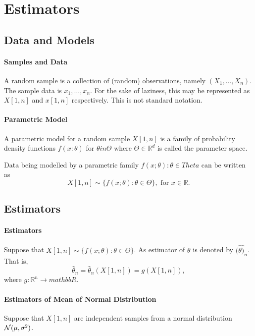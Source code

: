 \section{Estimators}

\subsection{Data and Models}

\paragraph{Samples and Data}
A random sample is a collection of (random) observations, namely
\((X_1, \ldots, X_n)\).
The sample data is \(x_1, \ldots, x_n\).
For the sake of laziness, this may be represented as
\(X[1, n]\) and  \(x[1, n]\) respectively.
This is not standard notation.

\paragraph{Parametric Model}
A parametric model for a random sample \(X[1, n]\)
is a family of probability density functions
\(f(x : \theta)\) for \(\theta in \Theta\) where \(\Theta \in  \mathbb{R}^d\)
is called the parameter space.

Data being modelled by a parametric family \(f(x; \theta): \theta \in  Theta\)
can be written as \[
  X[1, n] \sim \{f(x; \theta) : \theta \in \Theta\}, \text{ for } x \in \mathbb{R}
.\] 

\subsection{Estimators}

\paragraph{Estimators}
Suppose that \(X[1, n] \sim \{f(x; \theta) : \theta \in \Theta\} \).
As estimator of \(\theta\) is denoted by \((\hat{\theta)}_n\).
That is, \[
  \hat{\theta}_n = \hat{\theta}_n(X[1, n]) = g(X[1, n]),
\]  where \(g: \mathbb{R}^n \to mathbb{R}\).

\paragraph{Estimators of Mean of Normal Distribution}
Suppose that \(X[1, n]\) are independent samples from a normal distribution
\(\mathcal{N}(\mu, \sigma^2)\).

